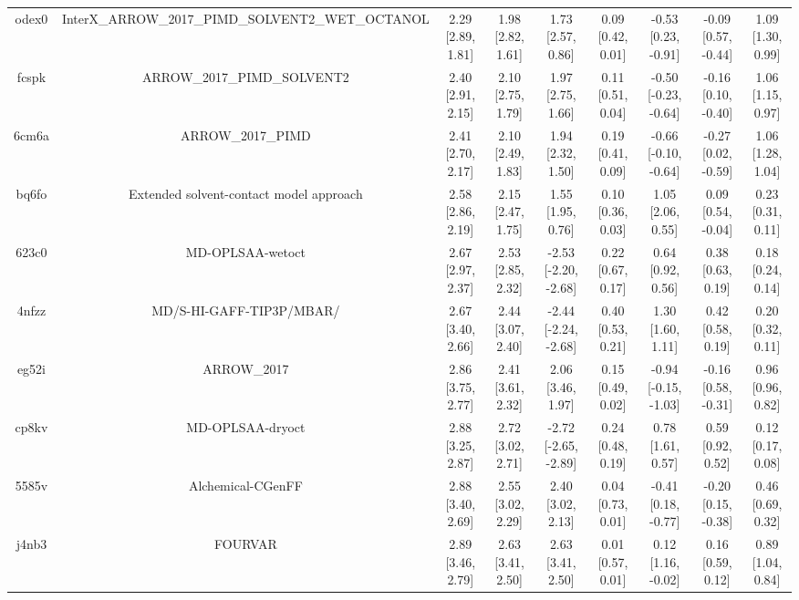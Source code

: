 \documentclass{article}
\begin{document}
\begin{center}
\begin{longtable}{|ccccccccc|}
 odex0 &  InterX\_ARROW\_2017\_PIMD\_SOLVENT2\_WET\_OCTANOL &  2.29 [2.89, 1.81] &  1.98 [2.82, 1.61] &     1.73 [2.57, 0.86] &  0.09 [0.42, 0.01] &   -0.53 [0.23, -0.91] &   -0.09 [0.57, -0.44] &     1.09 [1.30, 0.99] \\
 fcspk &                        ARROW\_2017\_PIMD\_SOLVENT2 &  2.40 [2.91, 2.15] &  2.10 [2.75, 1.79] &     1.97 [2.75, 1.66] &  0.11 [0.51, 0.04] &  -0.50 [-0.23, -0.64] &   -0.16 [0.10, -0.40] &     1.06 [1.15, 0.97] \\
 6cm6a &                                  ARROW\_2017\_PIMD &  2.41 [2.70, 2.17] &  2.10 [2.49, 1.83] &     1.94 [2.32, 1.50] &  0.19 [0.41, 0.09] &  -0.66 [-0.10, -0.64] &   -0.27 [0.02, -0.59] &     1.06 [1.28, 1.04] \\
 bq6fo &            Extended solvent-contact model approach &  2.58 [2.86, 2.19] &  2.15 [2.47, 1.75] &     1.55 [1.95, 0.76] &  0.10 [0.36, 0.03] &     1.05 [2.06, 0.55] &    0.09 [0.54, -0.04] &     0.23 [0.31, 0.11] \\
 623c0 &                                   MD-OPLSAA-wetoct &  2.67 [2.97, 2.37] &  2.53 [2.85, 2.32] &  -2.53 [-2.20, -2.68] &  0.22 [0.67, 0.17] &     0.64 [0.92, 0.56] &     0.38 [0.63, 0.19] &     0.18 [0.24, 0.14] \\
 4nfzz &                           MD/S-HI-GAFF-TIP3P/MBAR/ &  2.67 [3.40, 2.66] &  2.44 [3.07, 2.40] &  -2.44 [-2.24, -2.68] &  0.40 [0.53, 0.21] &     1.30 [1.60, 1.11] &     0.42 [0.58, 0.19] &     0.20 [0.32, 0.11] \\
 eg52i &                                        ARROW\_2017 &  2.86 [3.75, 2.77] &  2.41 [3.61, 2.32] &     2.06 [3.46, 1.97] &  0.15 [0.49, 0.02] &  -0.94 [-0.15, -1.03] &   -0.16 [0.58, -0.31] &     0.96 [0.96, 0.82] \\
 cp8kv &                                   MD-OPLSAA-dryoct &  2.88 [3.25, 2.87] &  2.72 [3.02, 2.71] &  -2.72 [-2.65, -2.89] &  0.24 [0.48, 0.19] &     0.78 [1.61, 0.57] &     0.59 [0.92, 0.52] &     0.12 [0.17, 0.08] \\
 5585v &                                  Alchemical-CGenFF &  2.88 [3.40, 2.69] &  2.55 [3.02, 2.29] &     2.40 [3.02, 2.13] &  0.04 [0.73, 0.01] &   -0.41 [0.18, -0.77] &   -0.20 [0.15, -0.38] &     0.46 [0.69, 0.32] \\
 j4nb3 &                                            FOURVAR &  2.89 [3.46, 2.79] &  2.63 [3.41, 2.50] &     2.63 [3.41, 2.50] &  0.01 [0.57, 0.01] &    0.12 [1.16, -0.02] &     0.16 [0.59, 0.12] &     0.89 [1.04, 0.84] \\

\end{longtable}
\end{center}
\end{document}
